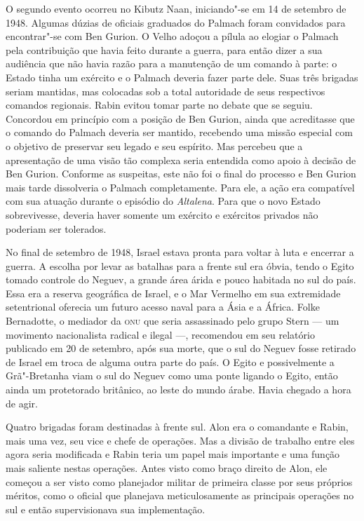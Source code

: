 O segundo evento ocorreu no Kibutz Naan, iniciando"-se em 14 de setembro
de 1948. Algumas dúzias de oficiais graduados do Palmach foram
convidados para encontrar"-se com Ben Gurion. O Velho adoçou a pílula ao
elogiar o Palmach pela contribuição que havia feito durante a guerra,
para então dizer a sua audiência que não havia razão para a manutenção
de um comando à parte: o Estado tinha um exército e o Palmach deveria
fazer parte dele. Suas três brigadas seriam mantidas, mas colocadas sob
a total autoridade de seus respectivos comandos regionais. Rabin evitou
tomar parte no debate que se seguiu. Concordou em princípio com a
posição de Ben Gurion, ainda que acreditasse que o comando do Palmach
deveria ser mantido, recebendo uma missão especial com o objetivo de
preservar seu legado e seu espírito. Mas percebeu que a apresentação de
uma visão tão complexa seria entendida como apoio à decisão de Ben
Gurion. Conforme as suspeitas, este não foi o final do processo e Ben
Gurion mais tarde dissolveria o Palmach completamente. Para ele, a ação
era compatível com sua atuação durante o episódio do \emph{Altalena}.
Para que o novo Estado sobrevivesse, deveria haver somente um exército e
exércitos privados não poderiam ser tolerados.

No final de setembro de 1948, Israel estava pronta para voltar à luta e
encerrar a guerra. A escolha por levar as batalhas para a frente sul era
óbvia, tendo o Egito tomado controle do Neguev, a grande área árida e
pouco habitada no sul do país. Essa era a reserva geográfica de Israel, e
o Mar Vermelho em sua extremidade setentrional oferecia um futuro acesso
naval para a Ásia e a África. Folke Bernadotte, o mediador da \textsc{onu} que
seria assassinado pelo grupo Stern --- um movimento nacionalista radical e
ilegal ---, recomendou em seu relatório publicado em 20 de setembro, após
sua morte, que o sul do Neguev fosse retirado de Israel em troca de
alguma outra parte do país. O Egito e possivelmente a Grã"-Bretanha viam
o sul do Neguev como uma ponte ligando o Egito, então ainda um
protetorado britânico, ao leste do mundo árabe. Havia chegado a hora de
agir.

Quatro brigadas foram destinadas à frente sul. Alon era o comandante e
Rabin, mais uma vez, seu vice e chefe de operações. Mas a divisão de
trabalho entre eles agora seria modificada e Rabin teria um papel mais
importante e uma função mais saliente nestas operações. Antes visto como
braço direito de Alon, ele começou a ser visto como planejador militar
de primeira classe por seus próprios méritos, como o oficial que planejava
meticulosamente as principais operações no sul e então supervisionava
sua implementação.

